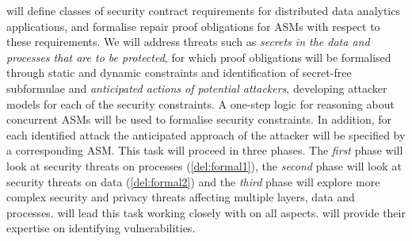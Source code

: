 \begin{Workpackage}{\thewpno}
\begin{Task}
\TaskResults{%
\ref{del:formal1},
\ref{del:formal2},
\ref{del:formal3}
}
\TaskHeader{}


\theTask{} will define classes of security contract requirements for distributed data analytics applications, and formalise repair proof obligations for ASMs with respect to these requirements. We will address %
threats such as \emph{secrets in the data and processes that are to be protected}, for which proof obligations will be formalised through static and dynamic constraints and identification of secret-free subformulae and \emph{anticipated actions of potential attackers}, developing attacker models for each of the security constraints. A one-step logic for reasoning about concurrent  ASMs will be used to formalise security constraints. In addition, for each identified attack the anticipated approach of the attacker will be specified by a corresponding ASM. This task will proceed in three phases. The \emph{first} phase will look at security threats on processes (\ref{del:formal1}), the \emph{second} phase will look at security threats on data (\ref{del:formal2}) and the \emph{third} phase will explore more complex security and privacy threats affecting multiple layers, data and processes. \SCCHshort will lead this task working closely with \SA on all aspects. \IBMshort will provide their expertise on identifying vulnerabilities.


\end{Task}
\end{Workpackage}
